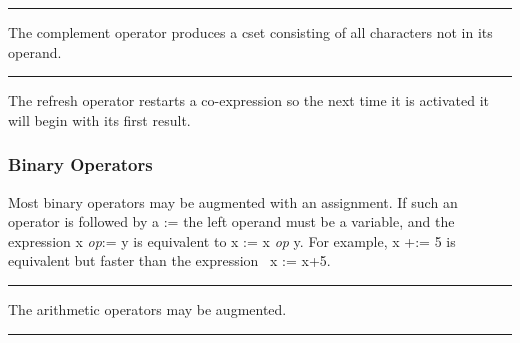 \bigskip\hrule\vspace{0.1cm}

\noindent
The complement operator produces a cset
consisting of all characters not in its operand.

\bigskip\hrule\vspace{0.1cm}

\noindent
{}The refresh operator restarts a
co-expression so the next time it is activated it will begin with its
first result.

\subsubsection[Binary Operators]{Binary Operators}

Most binary operators may be augmented with an
assignment. If such an operator is followed
by a \textsf{:=} the left operand must be a variable, and the
expression \textsf{x }\textsf{\textit{op}}\textsf{:= y} is equivalent
to \textsf{x := x }\textsf{\textit{op}}\textsf{ y}. For example,
\textsf{x +:= 5} is equivalent but faster than the expression
\ \textsf{x := x+5.}

\bigskip\hrule\vspace{0.1cm}






\noindent
The arithmetic operators may be augmented.

\bigskip\hrule\vspace{0.1cm}



